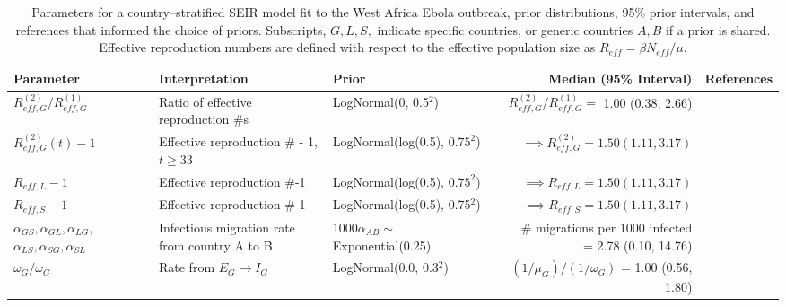 \begin{table}
	\begin{fullpage}
		\caption[Parameters and priors for a country--stratified SEIR model fit to the West Africa Ebola outbreak.]{Parameters for a country--stratified SEIR model fit to the West Africa Ebola outbreak, prior distributions, 95\% prior intervals, and references that informed the choice of priors. Subscripts, $ G,L,S, $ indicate specific countries, or generic countries $ A,B $ if a prior is shared. Effective reproduction numbers are defined with respect to the effective population size as $ R_{eff} = \beta N_{eff} /\mu $.}
		\label{tab:ebola_priors_joint_tight}
		\scriptsize
		\centering
		\begin{tabular}{lllrr}
			\hline
			\textbf{Parameter} &  \textbf{Interpretation} & \textbf{Prior} & \textbf{Median (95\% Interval)} & \textbf{References} \\ \hline
			$ R_{eff,G}^{(2)} / R_{eff,G}^{(1)} $ & Ratio of effective reproduction \#s &  LogNormal(0, 0.5$ ^2 $) & $ R_{eff,G}^{(2)} / R_{eff,G}^{(1)} = $ 1.00 (0.38, 2.66) & \cite{chowell2014transmission,chretien2015mathematical,coltart2017ebola,king2015avoidable} \\
			$ R_{eff,G}^{(2)}(t)-1 $ & Effective reproduction \# - 1, $ t\geq33 $ & LogNormal(log(0.5), $ 0.75^2 $) & $ \implies R_{eff,G}^{(2)} = 1.50 (1.11, 3.17)$ &  \cite{chowell2014transmission,chretien2015mathematical,coltart2017ebola,king2015avoidable} \\
			$ R_{eff,L} -1 $ & Effective reproduction \#-1 &  LogNormal(log(0.5), $ 0.75^2 $) & $ \implies R_{eff,L} = 1.50 (1.11, 3.17)$ &  \cite{chowell2014transmission,chretien2015mathematical,coltart2017ebola,king2015avoidable} \\
			$ R_{eff,S}-1 $ & Effective reproduction \#-1 & LogNormal(log(0.5), 0.75$ ^2 $) & $ \implies R_{eff,S} = 1.50 (1.11, 3.17)$ &  \cite{chowell2014transmission,chretien2015mathematical,coltart2017ebola,king2015avoidable}\\
			\makecell[l]{$ \alpha_{GS},\alpha_{GL}, \alpha_{LG},$\\
			$ \alpha_{LS},\alpha_{SG}, \alpha_{SL} $} & \makecell[l]{Infectious migration rate \\ from country A to B} & $ 1000\alpha_{AB} \sim$ Exponential(0.25) & \makecell[r]{\# migrations per 1000 infected \\ = 2.78 (0.10, 14.76)} & \cite{dudas2017virus}\\ 
			$ \omega_G/\omega_G $ & Rate from $ E_G\rightarrow I_G $ & LogNormal(0.0, 0.3$ ^2 $) & $ (1/\mu_G)\big/(1/\omega_G) $ = 1.00 (0.56, 1.80) & \cite{chowell2014transmission,velasquez2015time,glynn2017variability} \\

\end{tabular}
\end{fullpage}
\end{table}
